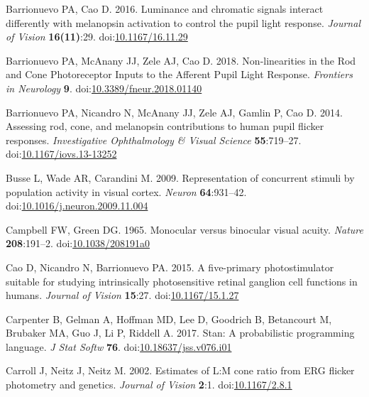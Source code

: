 \documentclass[
]{article}
\begin{document}
\leavevmode\hypertarget{ref-Barrionuevo2016}{}%
Barrionuevo PA, Cao D. 2016. Luminance and chromatic signals interact differently with melanopsin activation to control the pupil light response. \emph{Journal of Vision} \textbf{16(11)}:29. doi:\href{https://doi.org/10.1167/16.11.29}{10.1167/16.11.29}

\leavevmode\hypertarget{ref-Barrionuevo2018}{}%
Barrionuevo PA, McAnany JJ, Zele AJ, Cao D. 2018. Non-linearities in the Rod and Cone Photoreceptor Inputs to the Afferent Pupil Light Response. \emph{Frontiers in Neurology} \textbf{9}. doi:\href{https://doi.org/10.3389/fneur.2018.01140}{10.3389/fneur.2018.01140}

\leavevmode\hypertarget{ref-Barrionuevo2014}{}%
Barrionuevo PA, Nicandro N, McAnany JJ, Zele AJ, Gamlin P, Cao D. 2014. Assessing rod, cone, and melanopsin contributions to human pupil flicker responses. \emph{Investigative Ophthalmology \& Visual Science} \textbf{55}:719--27. doi:\href{https://doi.org/10.1167/iovs.13-13252}{10.1167/iovs.13-13252}

\leavevmode\hypertarget{ref-Busse2009}{}%
Busse L, Wade AR, Carandini M. 2009. Representation of concurrent stimuli by population activity in visual cortex. \emph{Neuron} \textbf{64}:931--42. doi:\href{https://doi.org/10.1016/j.neuron.2009.11.004}{10.1016/j.neuron.2009.11.004}

\leavevmode\hypertarget{ref-Campbell1965}{}%
Campbell FW, Green DG. 1965. Monocular versus binocular visual acuity. \emph{Nature} \textbf{208}:191--2. doi:\href{https://doi.org/10.1038/208191a0}{10.1038/208191a0}

\leavevmode\hypertarget{ref-Cao2015}{}%
Cao D, Nicandro N, Barrionuevo PA. 2015. A five-primary photostimulator suitable for studying intrinsically photosensitive retinal ganglion cell functions in humans. \emph{Journal of Vision} \textbf{15}:27. doi:\href{https://doi.org/10.1167/15.1.27}{10.1167/15.1.27}

\leavevmode\hypertarget{ref-Carpenter2017}{}%
Carpenter B, Gelman A, Hoffman MD, Lee D, Goodrich B, Betancourt M, Brubaker MA, Guo J, Li P, Riddell A. 2017. Stan: A probabilistic programming language. \emph{J Stat Softw} \textbf{76}. doi:\href{https://doi.org/10.18637/jss.v076.i01}{10.18637/jss.v076.i01}

\leavevmode\hypertarget{ref-Carroll2002}{}%
Carroll J, Neitz J, Neitz M. 2002. Estimates of L:M cone ratio from ERG flicker photometry and genetics. \emph{Journal of Vision} \textbf{2}:1. doi:\href{https://doi.org/10.1167/2.8.1}{10.1167/2.8.1}
\end{document}
